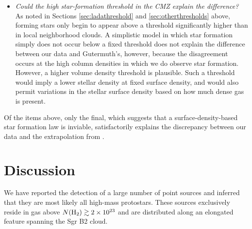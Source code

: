 \documentclass[twocolumn]{aastex61}
\begin{document}
\begin{itemize}
    \item \emph{Could the high star-formation threshold in the CMZ explain the
        difference?}
        As noted in Sections \ref{sec:ladathreshold} and
        \ref{sec:otherthresholds} above, forming stars only begin to appear
        above a threshold significantly higher than in local neighborhood
        clouds.  A simplistic model in which star formation simply does not
        occur below a fixed threshold does not explain the difference between
        our data and Gutermuth's, however, because the disagreement occurs at
        the high column densities in which we do observe star formation.
        However, a higher volume density threshold is plausible.  Such a threshold
        would imply a lower stellar density at fixed surface density, and would
        also permit variations in the stellar surface density based on how
        much dense gas is present.



\end{itemize}

Of the items above, only the final, which suggests that a surface-density-based
star formation law is inviable, satisfactorily explains the discrepancy between
our data and the extrapolation from \citet{Gutermuth2011a}.




\section{Discussion}
\label{sec:discussion}
We have reported the detection of a large number of point sources and inferred
that they are most likely all high-mass protostars.  These sources exclusively
reside in gas above $N(\textrm{H}_{2})\gtrsim2\times10^{23}$ \persc and are distributed along an
elongated  feature spanning the Sgr B2 cloud.
\end{document}
